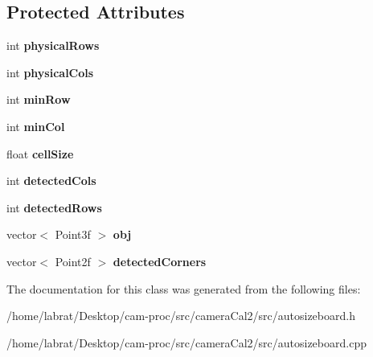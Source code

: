 \subsection*{Protected Attributes}
\begin{DoxyCompactItemize}
\item 
int {\bfseries physical\+Rows}\hypertarget{classautoSizeBoard_aae58c0a1f5e9ae76c9a31c04524ace57}{}\label{classautoSizeBoard_aae58c0a1f5e9ae76c9a31c04524ace57}

\item 
int {\bfseries physical\+Cols}\hypertarget{classautoSizeBoard_a1884b5cc7001ec76631501fa0737065f}{}\label{classautoSizeBoard_a1884b5cc7001ec76631501fa0737065f}

\item 
int {\bfseries min\+Row}\hypertarget{classautoSizeBoard_a6b3dd38b48698d625f642b12db43f56f}{}\label{classautoSizeBoard_a6b3dd38b48698d625f642b12db43f56f}

\item 
int {\bfseries min\+Col}\hypertarget{classautoSizeBoard_a217efd12c653eee72b9b013f13fc4ecd}{}\label{classautoSizeBoard_a217efd12c653eee72b9b013f13fc4ecd}

\item 
float {\bfseries cell\+Size}\hypertarget{classautoSizeBoard_ae0cd7700bd982b2d10e96bf3c7b4ee83}{}\label{classautoSizeBoard_ae0cd7700bd982b2d10e96bf3c7b4ee83}

\item 
int {\bfseries detected\+Cols}\hypertarget{classautoSizeBoard_aec5026e68f143093084d82fd3ddcbee5}{}\label{classautoSizeBoard_aec5026e68f143093084d82fd3ddcbee5}

\item 
int {\bfseries detected\+Rows}\hypertarget{classautoSizeBoard_a11d4099e4d545253ceaeb9562cd71432}{}\label{classautoSizeBoard_a11d4099e4d545253ceaeb9562cd71432}

\item 
vector$<$ Point3f $>$ {\bfseries obj}\hypertarget{classautoSizeBoard_a5f78ee36b8452d0e5a8467c091107c6d}{}\label{classautoSizeBoard_a5f78ee36b8452d0e5a8467c091107c6d}

\item 
vector$<$ Point2f $>$ {\bfseries detected\+Corners}\hypertarget{classautoSizeBoard_a53c3230fb22912aa96eeef9fd0382ab5}{}\label{classautoSizeBoard_a53c3230fb22912aa96eeef9fd0382ab5}

\end{DoxyCompactItemize}


The documentation for this class was generated from the following files\+:\begin{DoxyCompactItemize}
\item 
/home/labrat/\+Desktop/cam-\/proc/src/camera\+Cal2/src/autosizeboard.\+h\item 
/home/labrat/\+Desktop/cam-\/proc/src/camera\+Cal2/src/autosizeboard.\+cpp\end{DoxyCompactItemize}
